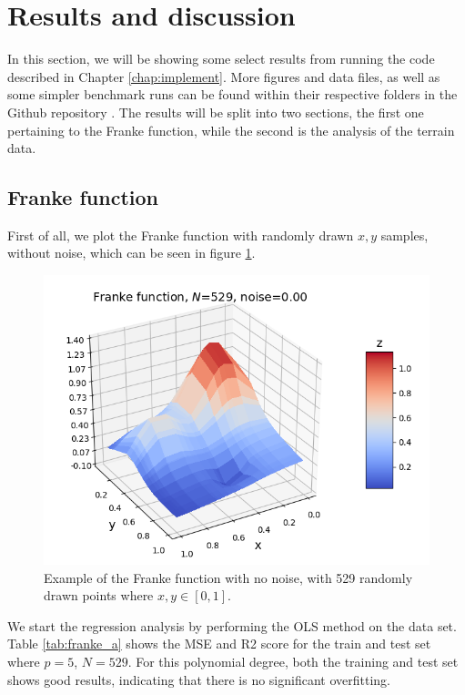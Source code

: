 \documentclass[a4paper]{article}
\begin{document}
\section{Results and discussion} \label{chap:results}
In this section, we will be showing some select results from running the code described in Chapter \ref{chap:implement}. More figures and data files, as well as some simpler benchmark runs can be found within their respective folders in the Github repository \cite{Github1}. The results will be split into two sections, the first one pertaining to the Franke function, while the second is the analysis of the terrain data.

\subsection{Franke function}
First of all, we plot the Franke function with randomly drawn $x,y$ samples, without noise, which can be seen in figure \ref{fig:franke_nonoise}.
\begin{figure}[H]
	\centering
	\includegraphics[scale=0.6]{../figures/task_a/surf_franke_N529_nf23_p5_noise0.00_seed4155.png}
	\caption{Example of the Franke function with no noise, with 529 randomly drawn points where $x,y \in [0,1]$.}
	\label{fig:franke_nonoise}
\end{figure}
%
We start the regression analysis by performing the OLS method on the data set. Table \ref{tab:franke_a} shows the MSE and R2 score for the train and test set where $p=5$, $N=529$. For this polynomial degree, both the training and test set shows good results, indicating that there is no significant overfitting.
\end{document}
